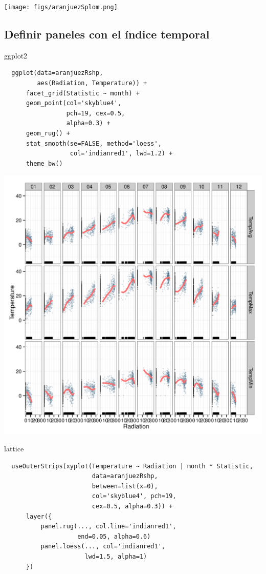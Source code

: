 \documentclass[xcolor={usenames,svgnames,dvipsnames}]{beamer}
\begin{document}
\begin{frame}[label=sec-4-1-2]{}
\texttt{[image: figs/aranjuezSplom.png]}
\end{frame}




\subsection{Definir paneles con el índice temporal}
\label{sec-4-2}

\begin{frame}[fragile,label=sec-4-2-1]{ggplot2}
 \lstset{language=R,label= ,caption= ,numbers=none}
\begin{lstlisting}
  ggplot(data=aranjuezRshp,
         aes(Radiation, Temperature)) +
      facet_grid(Statistic ~ month) +
      geom_point(col='skyblue4',
                 pch=19, cex=0.5,
                 alpha=0.3) +
      geom_rug() +
      stat_smooth(se=FALSE, method='loess',
                  col='indianred1', lwd=1.2) +
      theme_bw()
\end{lstlisting}
\end{frame}

\begin{frame}[label=sec-4-2-2]{}
\includegraphics[width=.9\linewidth]{figs/aranjuezFacetGrid.png}
\end{frame}


\begin{frame}[fragile,label=sec-4-2-3]{lattice}
 \lstset{language=R,label= ,caption= ,numbers=none}
\begin{lstlisting}
  useOuterStrips(xyplot(Temperature ~ Radiation | month * Statistic,
                        data=aranjuezRshp,
                        between=list(x=0),
                        col='skyblue4', pch=19,
                        cex=0.5, alpha=0.3)) +
      layer({
          panel.rug(..., col.line='indianred1',
                    end=0.05, alpha=0.6)
          panel.loess(..., col='indianred1',
                      lwd=1.5, alpha=1)
      })
\end{lstlisting}
\end{frame}
\end{document}
